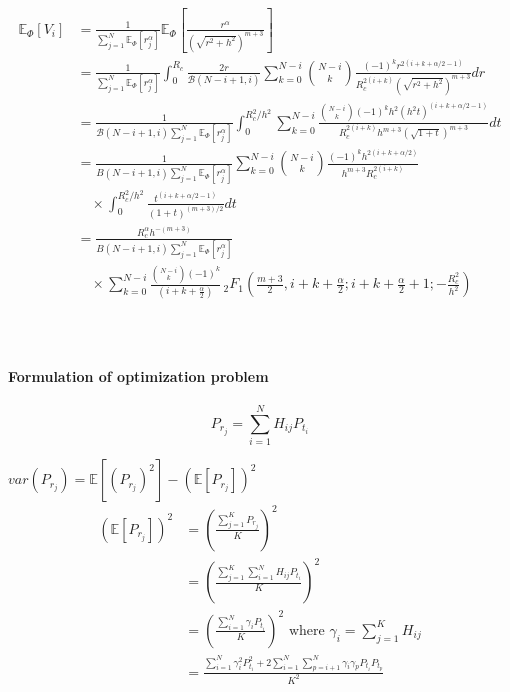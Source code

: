 \documentclass{beamer}
\providecommand{\sbrak}[1]{\ensuremath{{}\left[#1\right]}}
\providecommand{\brak}[1]{\ensuremath{\left(#1\right)}}
\theoremstyle{remark}
\begin{document}
   \begin{frame}
   \footnotesize{
\begin{align}
   \mathbb{E}_{\Phi}\sbrak{V_i}&=\frac{1}{\sum_{j=1}^N\mathbb{E}_{\Phi}\sbrak{r_j^{\alpha}} }\mathbb{E}_{\Phi}\sbrak{\frac{r^{\alpha}}{\brak{\sqrt{r^2+h^2}}^{m+3}}} \nonumber \\
   &=\frac{1}{\sum_{j=1}^N\mathbb{E}_{\Phi}\sbrak{r_j^{\alpha}} } \int_{0}^{R_c}\frac{2r}{\mathcal{B}\brak{N-i+1,i}} \sum_{k=0}^{N-i}\binom{N-i}{k}\frac{(-1)^{k}r^{2(i+k+\alpha/2-1)}}{R_c^{2(i+k)}\brak{\sqrt{r^2+h^2}}^{m+3}}dr \nonumber \\
    &=\frac{1}{\mathcal{B}\brak{N-i+1,i}\sum_{j=1}^N\mathbb{E}_{\Phi}\sbrak{r_j^{\alpha}} }  \int_{0}^{R_c^2/h^2} \sum_{k=0}^{N-i}\frac{\binom{N-i}{k}(-1)^{k}h^{2}\brak{h^2t}^{(i+k+\alpha/2-1)}}{R_c^{2(i+k)}h^{m+3}\brak{\sqrt{1+t}}^{m+3}}dt \nonumber \\
    &=\frac{1}{B\brak{N-i+1,i}\sum_{j=1}^N\mathbb{E}_{\Phi}\sbrak{r_j^{\alpha}} } \sum_{k=0}^{N-i}\binom{N-i}{k}\frac{(-1)^{k}h^{2(i+k+\alpha/2)}}{h^{m+3}R_c^{2(i+k)}}
    \nonumber \\
    & \quad \times \int_{0}^{R_c^2/h^2} \!\!\!\!\frac{t^{(i+k+\alpha/2-1)}}{\brak{1+t}^{\brak{m+3}/2}}dt \nonumber \\
     &=\frac{R_c^{\alpha}h^{-(m+3)}}{B\brak{N-i+1,i}\sum_{j=1}^N\mathbb{E}_{\Phi}\sbrak{r_j^{\alpha}}} \nonumber \\
     &\quad \times \sum_{k=0}^{N-i}\frac{\binom{N-i}{k}(-1)^{k}}{\brak{i+k+\frac{\alpha}{2}}}   \, _2F_1\brak{\frac{m+3}{2},i+k+\frac{\alpha}{2};i+k+\frac{\alpha}{2}+1;-\frac{R_c^2}{h^2}}
   \end{align}
}
\end{frame}
\begin{frame}
\frametitle{\,}
\framesubtitle{Formulation of optimization problem}
\begin{equation}
P_{r_j}=\sum_{i=1}^NH_{ij}P_{t_i}
\end{equation}

$var(P_{r_j})=\mathbb{E}\sbrak{\brak{P_{r_j}}^2}-\brak{\mathbb{E}\sbrak{P_{r_j}}}^2$
\footnotesize{
\begin{align}
\brak{\mathbb{E}\sbrak{P_{r_j}}}^2&=\brak{\frac{\sum_{j=1}^KP_{r_j}}{K}}^2\\ \nonumber
&=\brak{\frac{\sum_{j=1}^K\sum_{i=1}^NH_{ij}P_{t_i}}{K}}^2\\ \nonumber
&=\brak{\frac{\sum_{i=1}^N\gamma_iP_{t_i}}{K}}^2 \text{ where } \gamma_i=\sum_{j=1}^KH_{ij}\\ \nonumber
&=\frac{\sum_{i=1}^N\gamma_i^2P_{t_i}^2+2\sum_{i=1}^N\sum_{p=i+1}^{N}\gamma_i\gamma_pP_{t_i}P_{t_p}}{K^2}
\end{align}
}
\end{frame}
\end{document}
